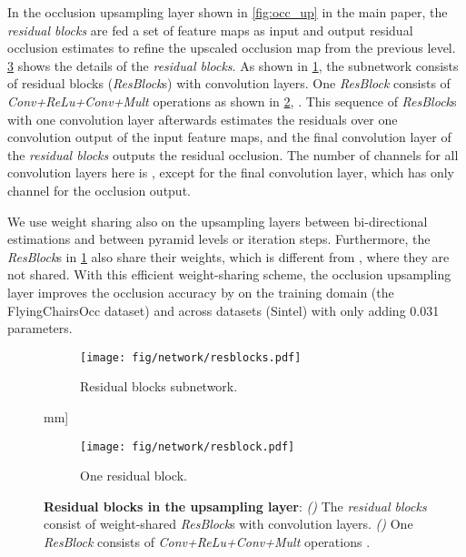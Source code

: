 \documentclass[10pt,twocolumn,letterpaper]{article}
\begin{document}
\begin{figure*}[t]
\begin{figure*}[t]
\begin{minipage}{0.245\textwidth}
In the occlusion upsampling layer shown in \cref{fig:occ_up} in the main paper, the \emph{residual blocks} \cite{Lim:2017:EDR} are fed a set of feature maps as input and output residual occlusion estimates to refine the upscaled occlusion map from the previous level.
\cref{fig:residual_blocks_all} shows the details of the \emph{residual blocks}. 
As shown in \cref{fig:residual_blocks}, the subnetwork consists of  residual blocks (\ie  \emph{ResBlock}s) with  convolution layers. 
One \emph{ResBlock} consists of \emph{Conv+ReLu+Conv+Mult} operations as shown in \cref{fig:one_residual_block}, \cf \cite{Lim:2017:EDR}.
This sequence of  \emph{ResBlock}s with one convolution layer afterwards estimates the residuals over one convolution output of the input feature maps, and the final convolution layer of the \emph{residual blocks} outputs the residual occlusion.
The number of channels for all convolution layers here is , except for the final convolution layer, which has only  channel for the occlusion output. 

We use weight sharing also on the upsampling layers between bi-directional estimations and between pyramid levels or iteration steps. 
Furthermore, the \emph{ResBlock}s in \cref{fig:residual_blocks} also share their weights, which is different from \cite{Lim:2017:EDR}, where they are not shared.
With this efficient weight-sharing scheme, the occlusion upsampling layer improves the occlusion accuracy by  on the training domain (\ie the FlyingChairsOcc dataset) and  across datasets (\ie Sintel) with only adding 0.031 \si{\mega} parameters.

\begin{figure}[t]
\centering
\begin{subfigure}{\linewidth}
  \texttt{[image: fig/network/resblocks.pdf]}
  \caption{Residual blocks subnetwork.}
  \label{fig:residual_blocks}  
\end{subfigure}\1mm]
\begin{subfigure}{\linewidth}
  \centering
  \texttt{[image: fig/network/resblock.pdf]}
  \caption{One residual block.}
  \label{fig:one_residual_block}
\end{subfigure}
\caption{\textbf{Residual blocks in the upsampling layer}: \emph{()} The \emph{residual blocks} consist of  weight-shared \emph{ResBlock}s with  convolution layers. \emph{()} One \emph{ResBlock} consists of \emph{Conv+ReLu+Conv+Mult} operations \cite{Lim:2017:EDR}. }
\label{fig:residual_blocks_all}
\vspace{-0.5em}
\end{figure}



\end{minipage}
\end{figure*}
\end{figure*}
\end{document}

